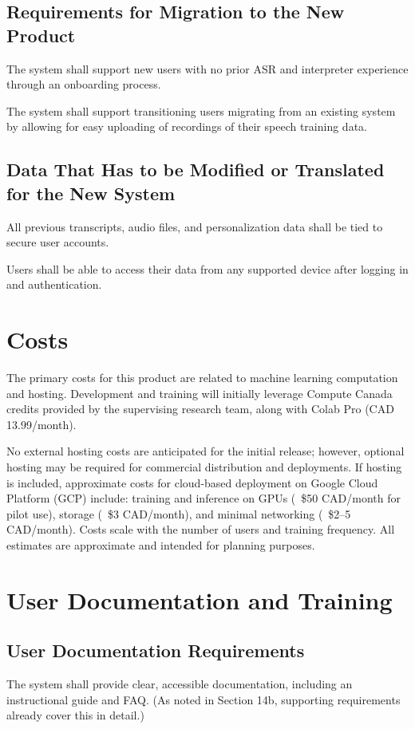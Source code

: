 \documentclass[12pt]{article}
\begin{document}
\subsection{Requirements for Migration to the New Product}
The system shall support new users with no prior ASR and interpreter experience through an onboarding process. 

The system shall support transitioning users migrating from an existing system by allowing for easy uploading of recordings of their speech training data.

\subsection{Data That Has to be Modified or Translated for the New System}
All previous transcripts, audio files, and personalization data shall be tied to secure user accounts.

Users shall be able to access their data from any supported device after logging in and authentication.

\section{Costs}
The primary costs for this product are related to machine learning computation and hosting. Development and training will initially leverage Compute Canada credits provided by the supervising research team, along with Colab Pro (CAD 13.99/month).

No external hosting costs are anticipated for the initial release; however, optional hosting may be required for commercial distribution and deployments. If hosting is included, approximate costs for cloud-based deployment on Google Cloud Platform (GCP) include: training and inference on GPUs (~\$50 CAD/month for pilot use), storage (~\$3 CAD/month), and minimal networking (~\$2–5 CAD/month). Costs scale with the number of users and training frequency. All estimates are approximate and intended for planning purposes.
\section{User Documentation and Training}
\subsection{User Documentation Requirements}
The system shall provide clear, accessible documentation, including an instructional guide and FAQ. (As noted in Section 14b, supporting requirements already cover this in detail.)
\end{document}
